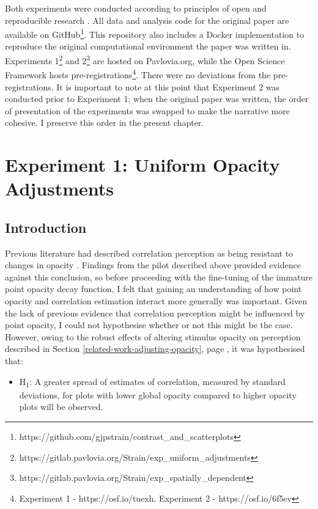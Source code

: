 \documentclass[../main.tex]{subfiles}
\begin{document}
Both experiments were conducted according to principles of open and
reproducible research \cite{ayris_2018}. All data and analysis code for
the original paper are available on GitHub\footnote{https://github.com/gjpstrain/contrast\_and\_scatterplots}.
This repository also includes a Docker implementation to reproduce the
original computational environment the paper was written in. Experiments
1\footnote{https://gitlab.pavlovia.org/Strain/exp\_uniform\_adjustments}
and 2\footnote{https://gitlab.pavlovia.org/Strain/exp\_spatially\_dependent}
are hosted on Pavlovia.org, while the Open Science Framework hosts
pre-registrations\footnote{Experiment 1 - https://osf.io/tuexh.
  Experiment 2 - https://osf.io/6f5ev}. There were no deviations from
the pre-registrations. It is important to note at this point that
Experiment 2 was conducted prior to Experiment 1; when the original
paper was written, the order of presentation of the experiments was
swapped to make the narrative more cohesive. I preserve this order in
the present chapter.

\section{Experiment 1: Uniform Opacity
Adjustments}\label{experiment-1-uniform-opacity-adjustments}

\subsection{Introduction}\label{introduction-e1}

Previous literature had described correlation perception as being
resistant to changes in opacity \cite{rensink_2012, rensink_2014}.
Findings from the pilot described above provided evidence against this
conclusion, so before proceeding with the fine-tuning of the immature
point opacity decay function, I felt that gaining an understanding of
how point opacity and correlation estimation interact more generally was
important. Given the lack of previous evidence that correlation
perception might be influenced by point opacity, I could not hypothesise
whether or not this might be the case. However, owing to the robust
effects of altering stimulus opacity on perception described in Section
\ref{related-work-adjusting-opacity}, page
\pageref{related-work-adjusting-opacity}
\cite{wehrhahn_1990, champion_2017}, it was hypothesised that:

\begin{itemize}
\tightlist
\item
  H\textsubscript{1}: A greater spread of estimates of correlation,
  measured by standard deviations, for plots with lower global opacity
  compared to higher opacity plots will be observed.
\end{itemize}
\end{document}
